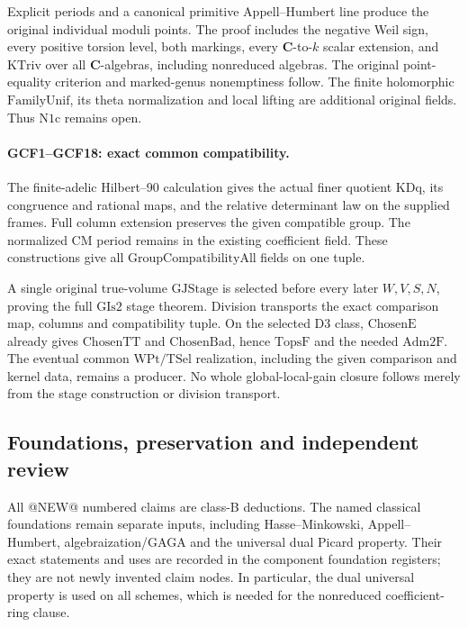 Explicit periods and a canonical primitive Appell--Humbert line
produce the original individual moduli points. The proof includes
the negative Weil sign, every positive torsion level, both markings,
every \(\mathbf C\)-to-\(k\) scalar extension, and
\(\mathrm{KTriv}\) over all \(\mathbf C\)-algebras, including
nonreduced algebras. The original point-equality criterion and
marked-genus nonemptiness follow. The finite holomorphic
\(\mathrm{FamilyUnif}\), its theta normalization and local lifting
are additional original fields. Thus \(\mathrm{N1c}\) remains open.

\paragraph{GCF1--GCF18: exact common compatibility.}
The finite-adelic Hilbert--90 calculation gives the actual finer
quotient \(\mathrm{KDq}\), its congruence and rational maps, and
the relative determinant law on the supplied frames. Full column
extension preserves the given compatible group. The normalized CM
period remains in the existing coefficient field. These constructions
give all \(\mathrm{GroupCompatibilityAll}\) fields on one tuple.

A single original true-volume \(\mathrm{GJStage}\) is selected
before every later \(W,V,S,N\), proving the full
\(\mathrm{GIs2}\) stage theorem. Division transports the exact
comparison map, columns and compatibility tuple. On the selected
D3 class, \(\mathrm{ChosenE}\) already gives
\(\mathrm{ChosenTT}\) and \(\mathrm{ChosenBad}\), hence
\(\mathrm{TopsF}\) and the needed \(\mathrm{Adm2F}\).
The eventual common \(\mathrm{WPt}/\mathrm{TSel}\) realization,
including the given comparison and kernel data, remains a producer.
No whole global-local-gain closure follows merely from the stage
construction or division transport.

\subsection{Foundations, preservation and independent review}

All @NEW@ numbered claims are class-B deductions. The named classical
foundations remain separate inputs, including Hasse--Minkowski,
Appell--Humbert, algebraization/GAGA and the universal dual Picard
property. Their exact statements and uses are recorded in the
component foundation registers; they are not newly invented claim
nodes. In particular, the dual universal property is used on all
schemes, which is needed for the nonreduced coefficient-ring clause.

